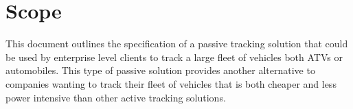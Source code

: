 \documentclass[11pt]{article}
\begin{document}
% 
%
%


\thispagestyle{empty}
\tableofcontents
\vspace{2cm}
\pagebreak



\section{Scope}
This document outlines the specification of a passive tracking solution that could be used by enterprise level clients to track a 
large fleet of vehicles both ATVs or automobiles. This type of passive solution provides another alternative to companies wanting to track 
their fleet of vehicles that is both cheaper and less power intensive than other active tracking solutions.
\end{document}
